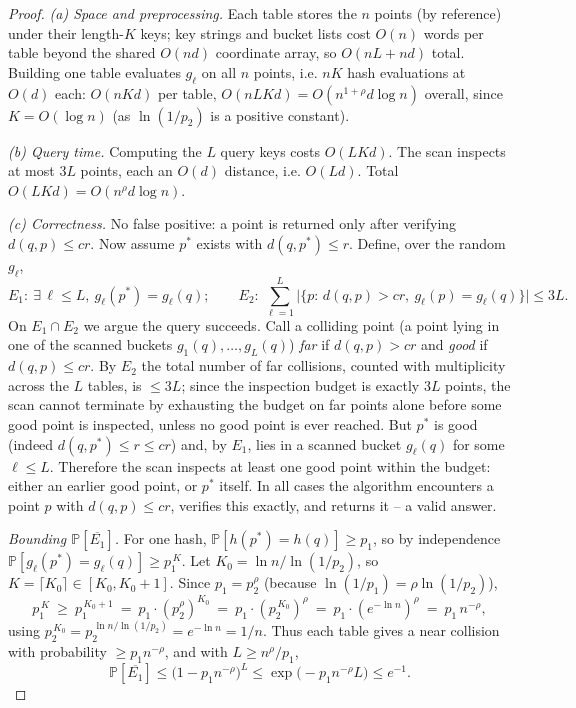 \documentclass{amsart}
\renewcommand{\Pr}{\mathbb{P}}
\begin{document}
\begin{proof}
\emph{(a) Space and preprocessing.}  Each table stores the $n$ points (by reference)
under their length-$K$ keys; key strings and bucket lists cost $O(n)$ words per table
beyond the shared $O(nd)$ coordinate array, so $O(nL+nd)$ total.  Building one table
evaluates $g_\ell$ on all $n$ points, i.e. $nK$ hash evaluations at $O(d)$ each:
$O(nKd)$ per table, $O(nLKd)=O(n^{1+\rho}d\log n)$ overall, since $K=O(\log n)$ (as
$\ln(1/p_2)$ is a positive constant).

\emph{(b) Query time.}  Computing the $L$ query keys costs $O(LKd)$.  The scan
inspects at most $3L$ points, each an $O(d)$ distance, i.e. $O(Ld)$.  Total
$O(LKd)=O(n^{\rho}d\log n)$.

\emph{(c) Correctness.}  No false positive: a point is returned only after verifying
$d(q,p)\le cr$.  Now assume $p^\ast$ exists with $d(q,p^\ast)\le r$.  Define, over the
random $g_\ell$,
\[
E_1:\ \exists\,\ell\le L,\ g_\ell(p^\ast)=g_\ell(q);
\qquad
E_2:\ \sum_{\ell=1}^L \big|\{p:\,d(q,p)>cr,\ g_\ell(p)=g_\ell(q)\}\big|\le 3L .
\]
On $E_1\cap E_2$ we argue the query succeeds.  Call a colliding point (a point
lying in one of the scanned buckets $g_1(q),\dots,g_L(q)$) \emph{far} if
$d(q,p)>cr$ and \emph{good} if $d(q,p)\le cr$.  By $E_2$ the total number of far
collisions, counted with multiplicity across the $L$ tables, is $\le 3L$; since the
inspection budget is exactly $3L$ points, the scan cannot terminate by exhausting the
budget on far points alone before some good point is inspected, unless no good point
is ever reached.  But $p^\ast$ is good (indeed $d(q,p^\ast)\le r\le cr$) and, by
$E_1$, lies in a scanned bucket $g_\ell(q)$ for some $\ell\le L$.  Therefore the scan
inspects at least one good point within the budget: either an earlier good point, or
$p^\ast$ itself.  In all cases the algorithm encounters a point $p$ with
$d(q,p)\le cr$, verifies this exactly, and returns it -- a valid answer.

\emph{Bounding $\Pr[\overline{E_1}]$.}  For one hash, $\Pr[h(p^\ast)=h(q)]\ge p_1$, so
by independence $\Pr[g_\ell(p^\ast)=g_\ell(q)]\ge p_1^{\,K}$.  Let
$K_0=\ln n/\ln(1/p_2)$, so $K=\lceil K_0\rceil\in[K_0,K_0+1]$.  Since $p_1=p_2^{\rho}$
(because $\ln(1/p_1)=\rho\ln(1/p_2)$),
\[
p_1^{\,K}\ \ge\ p_1^{\,K_0+1}\ =\ p_1\cdot (p_2^{\rho})^{K_0}\ =\ p_1\cdot (p_2^{\,K_0})^{\rho}
\ =\ p_1\cdot (e^{-\ln n})^{\rho}\ =\ p_1\,n^{-\rho},
\]
using $p_2^{\,K_0}=p_2^{\,\ln n/\ln(1/p_2)}=e^{-\ln n}=1/n$.  Thus each table gives a
near collision with probability $\ge p_1 n^{-\rho}$, and with $L\ge n^{\rho}/p_1$,
\[
\Pr[\overline{E_1}]\le \big(1-p_1 n^{-\rho}\big)^{L}
\le \exp\!\big(-p_1 n^{-\rho} L\big)\le e^{-1}.
\]


\end{proof}
\end{document}
